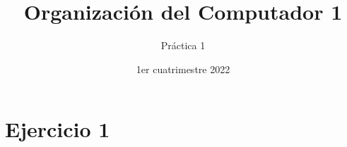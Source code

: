 

\title{Organización del Computador 1}
\author{Práctica 1}
\date{1er cuatrimestre 2022}



\maketitle
\tableofcontents
\newpage

\section{Ejercicio 1}

\subsection{}

